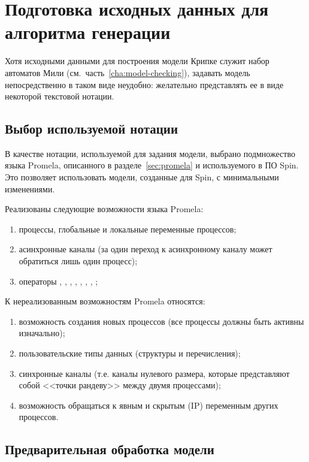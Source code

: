 \chapter{Подготовка исходных данных для алгоритма генерации}
\label{cha:code-gen}

Хотя исходными данными для построения модели Крипке служит набор автоматов Мили
(см.~часть~\ref{cha:model-checking}), задавать модель непосредственно в таком виде
неудобно: желательно представлять ее в виде некоторой текстовой нотации.

\section{Выбор используемой нотации}
\label{sec:notation-choice}

В качестве нотации, используемой для задания модели, выбрано подмножество языка Promela,
описанного в разделе~\ref{sec:promela} и используемого в ПО Spin. Это позволяет
использовать модели, созданные для Spin, с минимальными изменениями.

Реализованы следующие возможности языка Promela:
\begin{enumerate}
\item процессы, глобальные и локальные переменные процессов;
\item асинхронные каналы (за один переход к асинхронному каналу может обратиться лишь
  один процесс);
\item операторы , , , , ,
  , , ;
\end{enumerate}

К нереализованным возможностям Promela относятся:
\begin{enumerate}
\item возможность создания новых процессов (все процессы должны быть активны изначально);
\item пользовательские типы данных (структуры и перечисления);
\item синхронные каналы (т.е. каналы нулевого размера, которые представляют собой <<точки
  рандеву>> между двумя процессами);
\item возможность обращаться к явным и скрытым (IP) переменным других процессов.
\end{enumerate}

\section{Предварительная обработка модели}
\label{sec:idef0-codegen}

